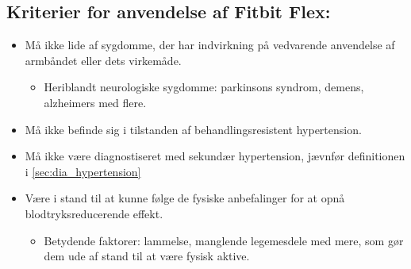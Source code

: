 \subsection*{Kriterier for anvendelse af Fitbit Flex:}
\begin{itemize}
\item Må ikke lide af sygdomme, der har indvirkning på vedvarende anvendelse af armbåndet eller dets virkemåde. 
	\begin{itemize}
	\item Heriblandt neurologiske sygdomme: parkinsons syndrom, demens, alzheimers med flere.
	\end{itemize}

\item Må ikke befinde sig i tilstanden af behandlingsresistent hypertension. 

\item Må ikke være diagnostiseret med sekundær hypertension, jævnfør definitionen i \autoref{sec:dia_hypertension} %

\item Være i stand til at kunne følge de fysiske anbefalinger for at opnå blodtryksreducerende effekt. 
	\begin{itemize}
	\item Betydende faktorer: lammelse, manglende legemesdele med mere, som gør dem ude af stand til at være fysisk aktive. 
	\end{itemize}  

\end{itemize}




